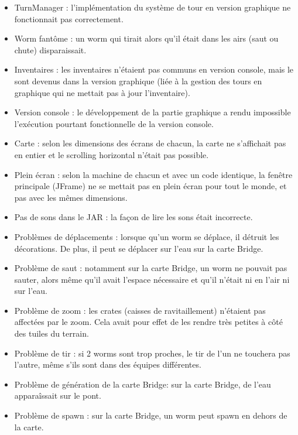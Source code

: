 \documentclass[a4paper, 12pt]{article}
\begin{document}
            \begin{itemize}
                \item TurnManager : l'implémentation du système de tour en version graphique ne fonctionnait pas correctement.
                \item Worm fantôme : un worm qui tirait alors qu'il était dans les airs (saut ou chute) disparaissait.
                \item Inventaires : les inventaires n'étaient pas communs en version console, mais le sont devenus dans la version graphique (liée à la gestion des tours en graphique qui ne mettait pas à jour l'inventaire).
                \item Version console : le développement de la partie graphique a rendu impossible l'exécution pourtant fonctionnelle de la version console.
                \item Carte : selon les dimensions des écrans de chacun, la carte ne s'affichait pas en entier et le scrolling horizontal n'était pas possible.
                \item Plein écran : selon la machine de chacun et avec un code identique, la fenêtre principale (JFrame) ne se mettait pas en plein écran pour tout le monde, et pas avec les mêmes dimensions.
                \item Pas de sons dans le JAR : la façon de lire les sons était incorrecte.
                \item Problèmes de déplacements : lorsque qu'un worm se déplace, il détruit les décorations. De plus, il peut se déplacer sur l'eau sur la carte Bridge.
                \item Problème de saut : notamment sur la carte Bridge, un worm ne pouvait pas sauter, alors même qu'il avait l'espace nécessaire et qu'il n'était ni en l'air ni sur l'eau.
                \item Problème de zoom : les crates (caisses de ravitaillement) n'étaient pas affectées par le zoom. Cela avait pour effet de les rendre très petites à côté des tuiles du terrain.
                \item Problème de tir : si 2 worms sont trop proches, le tir de l'un ne touchera pas l'autre, même s'ils sont dans des équipes différentes.
                \item Problème de génération de la carte Bridge: sur la carte Bridge, de l'eau apparaîssait sur le pont.
                \item Problème de spawn : sur la carte Bridge, un worm peut spawn en dehors de la carte.
            \end{itemize}
\end{document}
